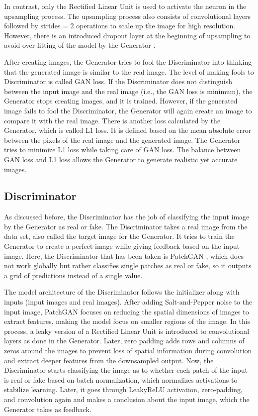 In contrast, only the Rectified Linear Unit is used to activate the neuron in the upsampling process. The upsampling process also consists of convolutional layers followed by strides = 2 operations to scale up the image for high resolution. However, there is an introduced dropout layer at the beginning of upsampling to avoid over-fitting of the model by the Generator \cite{isola2017image}.

After creating images, the Generator tries to fool the Discriminator into thinking that the generated image is similar to the real image. The level of making fools to Discriminator is called GAN loss. If the Discriminator does not distinguish between the input image and the real image (i.e., the GAN loss is minimum), the Generator stops creating images, and it is trained. However, if the generated image fails to fool the Discriminator, the Generator will again create an image to compare it with the real image. There is another loss calculated by the Generator, which is called L1 loss. It is defined based on the mean absolute error between the pixels of the real image and the generated image. The Generator tries to minimize L1 loss while taking care of GAN loss. The balance between GAN loss and L1 loss allows the Generator to generate realistic yet accurate images.

\subsection{Discriminator}
As discussed before, the Discriminator has the job of classifying the input image by the Generator as real or fake. The Discriminator takes a real image from the data set, also called the target image for the Generator. It tries to train the Generator to create a perfect image while giving feedback based on the input image. Here, the Discriminator that has been taken is PatchGAN \cite{isola2017image}, which does not work globally but rather classifies single patches as real or fake, so it outputs a grid of predictions instead of a single value. 

The model architecture of the Discriminator follows the initializer along with inputs (input images and real images). After adding Salt-and-Pepper noise to the input image, PatchGAN focuses on reducing the spatial dimensions of images to extract features, making the model focus on smaller regions of the image. In this process, a leaky version of a Rectified Linear Unit is introduced to convolutional layers as done in the Generator. Later, zero padding adds rows and columns of zeros around the images to prevent loss of spatial information during convolution and extract deeper features from the downsampled output. Now, the Discriminator starts classifying the image as to whether each patch of the input is real or fake based on batch normalization, which normalizes activations to stabilize learning. Later, it goes through LeakyReLU activation, zero-padding, and convolution again and makes a conclusion about the input image, which the Generator takes as feedback.

